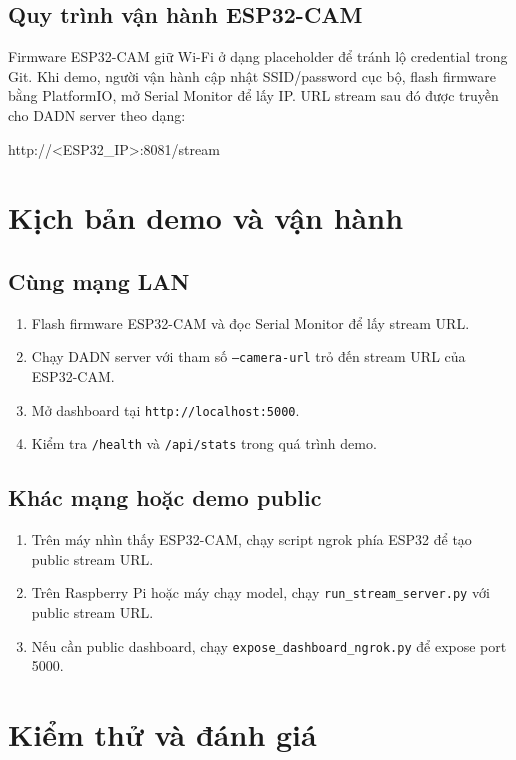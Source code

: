 \documentclass[oneside,final]{hcmut-report}
\begin{document}
\subsection{Quy trình vận hành ESP32-CAM}
Firmware ESP32-CAM giữ Wi-Fi ở dạng placeholder để tránh lộ credential trong Git. Khi demo, người vận hành cập nhật SSID/password cục bộ, flash firmware bằng PlatformIO, mở Serial Monitor để lấy IP. URL stream sau đó được truyền cho DADN server theo dạng:
\begin{center}
  \footnotesize\ttfamily http://<ESP32\_IP>:8081/stream
\end{center}

\section{Kịch bản demo và vận hành}

\subsection{Cùng mạng LAN}
\begin{enumerate}
  \item Flash firmware ESP32-CAM và đọc Serial Monitor để lấy stream URL.
  \item Chạy DADN server với tham số \texttt{--camera-url} trỏ đến stream URL của ESP32-CAM.
  \item Mở dashboard tại \texttt{http://localhost:5000}.
  \item Kiểm tra \texttt{/health} và \texttt{/api/stats} trong quá trình demo.
\end{enumerate}

\subsection{Khác mạng hoặc demo public}
\begin{enumerate}
  \item Trên máy nhìn thấy ESP32-CAM, chạy script ngrok phía ESP32 để tạo public stream URL.
  \item Trên Raspberry Pi hoặc máy chạy model, chạy \texttt{run\_stream\_server.py} với public stream URL.
  \item Nếu cần public dashboard, chạy \texttt{expose\_dashboard\_ngrok.py} để expose port 5000.
\end{enumerate}

\section{Kiểm thử và đánh giá}
\end{document}
